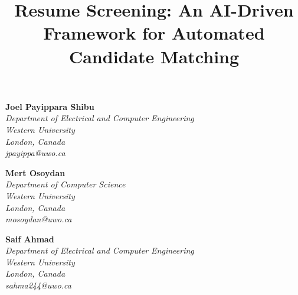 \documentclass[a4paper]{article}
\title{\textbf{Resume Screening: An AI-Driven Framework for Automated Candidate Matching}}
\date{}
\begin{document}
\maketitle
\vspace{-1.5cm}

\begin{multicols}{3}
\centering
\textbf{Joel Payippara Shibu}\\
\textit{Department of Electrical and Computer Engineering}\\
\textit{Western University}\\
\textit{London, Canada}\\
\textit{jpayippa@uwo.ca}\\

\columnbreak

\textbf{Mert Osoydan}\\
\textit{Department of Computer Science}\\
\textit{Western University}\\
\textit{London, Canada}\\
\textit{mosoydan@uwo.ca}\\

\columnbreak

\textbf{Saif Ahmad}\\
\textit{Department of Electrical and Computer Engineering}\\
\textit{Western University}\\
\textit{London, Canada}\\
\textit{sahma244@uwo.ca}\\
\end{multicols}
\end{document}
